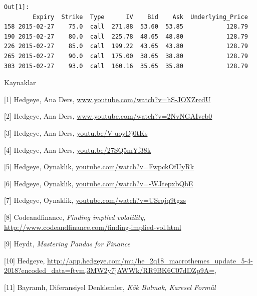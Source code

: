 \documentclass[12pt,fleqn]{article}\usepackage{../../common}
\begin{document}
\begin{verbatim}
Out[1]: 
        Expiry  Strike  Type      IV    Bid    Ask  Underlying_Price
158 2015-02-27    75.0  call  271.88  53.60  53.85            128.79
190 2015-02-27    80.0  call  225.78  48.65  48.80            128.79
226 2015-02-27    85.0  call  199.22  43.65  43.80            128.79
265 2015-02-27    90.0  call  175.00  38.65  38.80            128.79
303 2015-02-27    93.0  call  160.16  35.65  35.80            128.79
\end{verbatim}

Kaynaklar

[1] Hedgeye, Ana Ders, \url{www.youtube.com/watch?v=hS-JOXZrcdU}

[2] Hedgeye, Ana Ders, \url{www.youtube.com/watch?v=2NvNGAIvcb0}

[3] Hedgeye, Ana Ders, \url{youtu.be/V-uoyDj0tKs}

[4] Hedgeye, Ana Ders, \url{youtu.be/27SQ5mYf38k}

[5] Hedgeye, Oynaklik, \url{youtube.com/watch?v=FwpckOfUyRk}

[6] Hedgeye, Oynaklik, \url{youtube.com/watch?v=-WJtepxbQbE}

[7] Hedgeye, Oynaklik, \url{youtube.com/watch?v=USrojq9tgzs}

[8] Codeandfinance, {\em Finding implied volatility},
    \url{http://www.codeandfinance.com/finding-implied-vol.html}

[9] Heydt, {\em Mastering Pandas for Finance}

[10] Hedgeye, \url{http://app.hedgeye.com/mu/he_2q18_macrothemes_update_5-4-2018?encoded_data=ftvm,3MW2y7jAWWk/RR9BK6C07dDZp9A=,}

[11] Bayramlı, Diferansiyel Denklemler, {\em Kök Bulmak, Karesel Formül}
\end{document}
